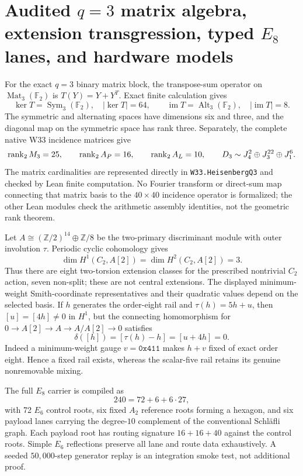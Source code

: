 \section{Audited $q=3$ matrix algebra, extension transgression, typed $E_8$ lanes, and hardware models}
\label{sec:levi-v5-closure}

For the exact $q=3$ binary matrix block, the transpose-sum operator on
$\operatorname{Mat}_3(\mathbb F_2)$ is $T(Y)=Y+Y^T$.  Exact finite
calculation gives
\[
 \ker T=\operatorname{Sym}_3(\mathbb F_2),\quad |\ker T|=64,
 \qquad
 \operatorname{im}T=\operatorname{Alt}_3(\mathbb F_2),\quad |\operatorname{im}T|=8.
\]
The symmetric and alternating spaces have dimensions six and three, and the
diagonal map on the symmetric space has rank three.  Separately, the complete
native W33 incidence matrices give
\[
 \operatorname{rank}_2 M_3=25,\qquad \operatorname{rank}_2 A_P=16,\qquad \operatorname{rank}_2 A_L=10,
 \qquad D_3\sim J_4^2\oplus J_3^{22}\oplus J_1^6.
\]
The matrix cardinalities are represented directly in
\texttt{W33.HeisenbergQ3} and checked by Lean finite computation.  No Fourier
transform or direct-sum map connecting that matrix basis to the $40\times40$
incidence operator is formalized; the other Lean modules check the arithmetic
assembly identities, not the geometric rank theorem.

Let $A\cong(\mathbb Z/2)^{14}\oplus\mathbb Z/8$ be the two-primary
discriminant module with outer involution $\tau$.  Periodic cyclic cohomology
gives
\[
 \dim H^1(C_2,A[2])=\dim H^2(C_2,A[2])=3.
\]
Thus there are eight two-torsion extension classes for the prescribed
nontrivial $C_2$ action, seven non-split; these are not central extensions.
The displayed minimum-weight Smith-coordinate representatives and their
quadratic values depend on the selected basis. If $h$
generates the order-eight rail and $\tau(h)=5h+u$, then $[u]=[4h]\ne0$ in
$H^1$, but the connecting homomorphism for
$0\to A[2]\to A\to A/A[2]\to0$ satisfies
\[
 \boxed{\delta([h])=[\tau(h)-h]=[u+4h]=0.}
\]
Indeed a minimum-weight gauge $v=\mathtt{0x411}$ makes $h+v$ fixed of exact
order eight.  Hence a fixed rail exists, whereas the scalar-five rail retains
its genuine nonremovable mixing.

The full $E_8$ carrier is compiled as
\[
 \boxed{240=72+6+6\cdot27},
\]
with 72 $E_6$ control roots, six fixed $A_2$ reference roots forming a
hexagon, and six payload lanes carrying the degree-$10$ complement of the
conventional Schl\"afli graph.  Each payload root has routing
signature $16+16+40$ against the control roots.  Simple $E_6$ reflections
preserve all lane and route data exhaustively.  A seeded $50{,}000$-step
generator replay is an integration smoke test, not additional proof.


